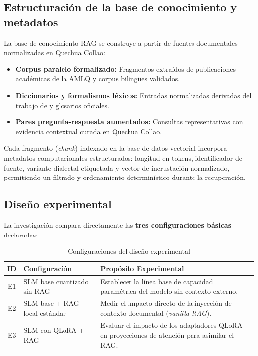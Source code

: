 \subsection{Estructuración de la base de conocimiento y metadatos}
\label{sec:ambito_pedagogico}

La base de conocimiento RAG se construye a partir de fuentes documentales normalizadas en Quechua Collao:
\begin{itemize}
    \item \textbf{Corpus paralelo formalizado:} Fragmentos extraídos de publicaciones académicas de la AMLQ y corpus bilingües validados.
    \item \textbf{Diccionarios y formalismos léxicos:} Entradas normalizadas derivadas del trabajo de \citet{Duran2026} y glosarios oficiales.
    \item \textbf{Pares pregunta-respuesta aumentados:} Consultas representativas con evidencia contextual curada en Quechua Collao.
\end{itemize}

Cada fragmento (\textit{chunk}) indexado en la base de datos vectorial incorpora metadatos computacionales estructurados: longitud en tokens, identificador de fuente, variante dialectal etiquetada y vector de incrustación normalizado, permitiendo un filtrado y ordenamiento determinístico durante la recuperación.

\subsection{Diseño experimental}

La investigación compara directamente las \textbf{tres configuraciones básicas} declaradas:

\begin{table}[H]
\centering
\caption{Configuraciones del diseño experimental}
\label{tab:experimentos}
\small
\begin{tabular}{@{}clp{9cm}@{}}
\toprule
\textbf{ID} & \textbf{Configuración} & \textbf{Propósito Experimental} \\
\midrule
E1 & SLM base cuantizado sin RAG & Establecer la línea base de capacidad paramétrica del modelo sin contexto externo. \\
\midrule
E2 & SLM base + RAG local estándar & Medir el impacto directo de la inyección de contexto documental (\textit{vanilla RAG}). \\
\midrule
E3 & SLM con QLoRA + RAG & Evaluar el impacto de los adaptadores QLoRA en proyecciones de atención para asimilar el RAG. \\
\bottomrule
\end{tabular}
\end{table}


